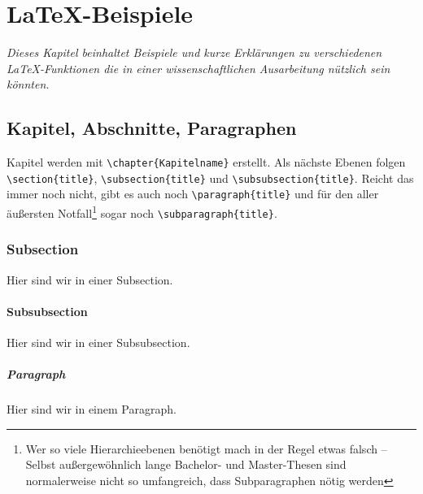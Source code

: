 \chapter{\LaTeX-Beispiele}
	\emph{Dieses Kapitel beinhaltet Beispiele und kurze Erklärungen zu verschiedenen \LaTeX-Funktionen die in einer wissenschaftlichen Ausarbeitung nützlich sein könnten.%
	 }
		
	\section{Kapitel, Abschnitte, Paragraphen}\label{sec:chapter-section-paragraph}
		Kapitel werden mit \lstinline|\chapter{Kapitelname}| erstellt.
		Als nächste Ebenen folgen \lstinline|\section{title}|, \lstinline|\subsection{title}| und \lstinline|\subsubsection{title}|.
		Reicht das immer noch nicht, gibt es auch noch \lstinline|\paragraph{title}| und für den aller äußersten Notfall\footnote{Wer so viele Hierarchieebenen benötigt mach in der Regel etwas falsch -- Selbst außergewöhnlich lange Bachelor- und Master-Thesen sind normalerweise nicht so umfangreich, dass Subparagraphen nötig werden} sogar noch \lstinline|\subparagraph{title}|.
		\begin{vorlagenbeispiel}
			\subsection{Subsection}
				Hier sind wir in einer Subsection.
				\subsubsection{Subsubsection}
					Hier sind wir in einer Subsubsection.
					\paragraph{Paragraph}
						Hier sind wir in einem Paragraph.
		\end{vorlagenbeispiel}
		
